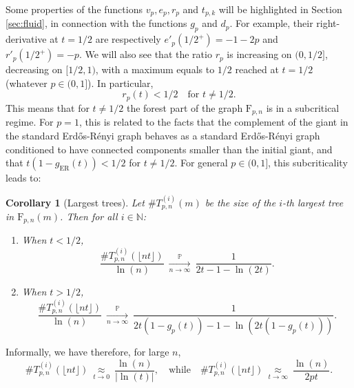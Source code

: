 \documentclass[a4, 11pt]{article}
\numberwithin{equation}{section}
\theoremstyle{plain}
\newtheorem{corollary}[theorem]{Corollary}
\theoremstyle{definition}
\theoremstyle{remark}
\begin{document}
\begin{figure}
	\centering
	\qquad {}
	\label{fig:f_p_d_p}
\end{figure}

\bigskip

Some properties of the functions $v_p,e_p, r_p$ and $t_{p,k}$ will be highlighted in Section \ref{sec:fluid}, in connection with the functions $g_p$ and $d_p$. For example, their right-derivative at $t=1/2$ are respectively $e'_p(1/2^+)=-1-2p$ and $r'_p(1/2^+)=-p$. We will also see that the ratio $r_p$ is increasing on $(0,1/2]$, decreasing on $[1/2,1)$, with a maximum equals to $1/2$ reached at $t=1/2$ (whatever $p \in (0,1]$). In particular,
$$
r_p(t)<1/2 \quad \text{for }t\neq 1/2.
$$
This means that for $t\neq 1/2$ the forest part of the graph $\mathrm{F}_{p,n}$ is in a subcritical regime. For $p=1$, this is related to the facts that the complement of the giant in the standard Erd\H{o}s-R\'enyi graph behaves as a standard Erd\H{o}s-R\'enyi graph conditioned to have connected components smaller than the initial giant, and that $t(1-g_{\mathrm{ER}}(t))<1/2$ for $t\neq 1/2$. For general $p \in (0,1]$, this subcriticality leads to: 
 
\bigskip

\begin{corollary}[Largest trees]
\label{prop:cc}
Let $\#T^{(i)}_{p,n}(m)$ be the size of the $i$-th largest tree in $\mathrm{F}_{p,n}(m)$. Then for all $i \in \mathbb N$:
\begin{enumerate}[topsep=0cm]
\item[\emph{1)}] When $t<1/2$, 
$$\frac{\#T^{(i)}_{p,n}(\lfloor nt \rfloor)}{\ln(n)} ~ \underset{n \rightarrow \infty}{\overset{\mathbb P} \longrightarrow}~  \frac{1}{2t-1-\ln(2t)}.$$
\item[\emph{2)}] When $t>1/2$, $$\frac{\#T^{(i)}_{p,n}(\lfloor nt \rfloor)}{\ln(n)} ~ \underset{n \rightarrow \infty}{\overset{\mathbb P} \longrightarrow}~  \frac{1}{2t(1-g_p(t))-1-\ln(2t(1-g_p(t)))}.$$\end{enumerate}
\end{corollary}

\bigskip

Informally, we have therefore, for large $n$,
$$
\#T^{(i)}_{p,n}(\lfloor nt \rfloor)~\underset{t \rightarrow 0}\approx~\frac{\ln(n)}{|\ln(t)|}, \quad \text{while} \quad  \#T^{(i)}_{p,n}(\lfloor nt \rfloor)~\underset{t \rightarrow \infty}\approx~\frac{\ln(n)}{2pt}.
$$
\end{document}
